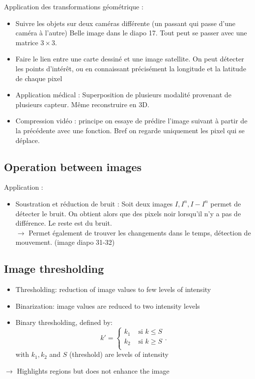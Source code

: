 \documentclass{article}
\theoremstyle{plain}%
\theoremstyle{definition}
\theoremstyle{remark}
\begin{document}
Application des transformations géométrique : 
\begin{itemize}
    \item Suivre les objets sur deux caméras différente (un passant qui passe d'une caméra à l'autre) Belle image dans le diapo 17. Tout peut se passer avec une matrice $ 3 \times 3 $.
    \item Faire le lien entre une carte dessiné et une image satellite. On peut détecter les points d’intérêt, ou en connaissant précisément la longitude et la latitude de chaque pixel
    \item Application médical : Superposition de plusieurs modalité provenant de plusieurs capteur. Même reconstruire en 3D.
    \item Compression vidéo : principe on essaye de prédire l'image suivant à partir de la précédente avec une fonction. Bref on regarde uniquement les pixel qui se déplace. 
\end{itemize}

\subsection{Operation between images}
Application : \begin{itemize}
    \item Soustration et réduction de bruit : Soit deux images $ I, I^n, I - I^n $ permet de détecter le bruit. On obtient alors que des pixels noir lorsqu'il n'y a pas de différence. Le reste est du bruit. \\
    $\rightarrow$ Permet également de trouver les changements dans le temps, détection de mouvement. (image diapo 31-32)
\end{itemize}

\subsection{Image thresholding}
\begin{itemize}
    \item Thresholding: reduction of image values to few levels of intensity
    \item Binarization: image values are reduced to two intensity levels
    \item Binary thresholding, defined by: 
    \[
        k' = \begin{cases}
        k_1 &\text{ si } k \leq S\\
        k_2 &\text{ si } k \geq S\\
        \end{cases} 
    .\]
    with $ k_1, k_2 $  and $ S $ (threshold) are levels of intensity
\end{itemize}
$\rightarrow$ Highlights regions but does not enhance the image
\end{document}
